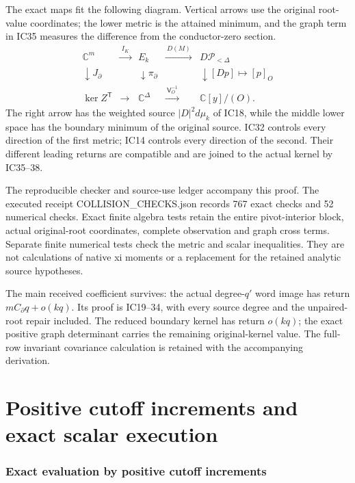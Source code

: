 \documentclass[11pt]{article}
\begin{document}
The exact maps fit the following diagram. Vertical arrows use the original root-value coordinates; the lower metric is the attained minimum, and the graph term in IC35 measures the difference from the conductor-zero section. \[
\begin{array}{ccccc}
\mathbb C^m&\xrightarrow{\ I_K\ }&E_k&\xrightarrow{\ D(M)\ }&D\mathcal P_{<\Delta}\\
\downarrow J_\partial&&\downarrow\pi_\partial&&\downarrow[D p]\mapsto[p]_O\\
\ker Z^{\mathsf T}&\longrightarrow&\mathbb C^\Delta&\xrightarrow{\ \mathsf V_O^{-1}\ }&\mathbb C[y]/(O).
\end{array}
\] The right arrow has the weighted source \(|D|^2d\mu_k\) of IC18, while the middle lower space has the boundary minimum of the original source. IC32 controls every direction of the first metric; IC14 controls every direction of the second. Their different leading returns are compatible and are joined to the actual kernel by IC35--38.

The reproducible checker and source-use ledger accompany this proof. The executed receipt COLLISION\_CHECKS.json records 767 exact checks and 52 numerical checks. Exact finite algebra tests retain the entire pivot-interior block, actual original-root coordinates, complete observation and graph cross terms. Separate finite numerical tests check the metric and scalar inequalities. They are not calculations of native xi moments or a replacement for the retained analytic source hypotheses.

The main received coefficient survives: the actual degree-\(q'\) word image has return \(mC_\partial q+o(kq)\). Its proof is IC19--34, with every source degree and the unpaired-root repair included. The reduced boundary kernel has return \(o(kq)\); the exact positive graph determinant carries the remaining original-kernel value. The full-row invariant covariance calculation is retained with the accompanying derivation.

\clearpage\part{Positive cutoff increments and exact scalar execution}
\section{Exact evaluation by positive cutoff increments}\label{exact-evaluation-by-positive-cutoff-increments}
\end{document}
